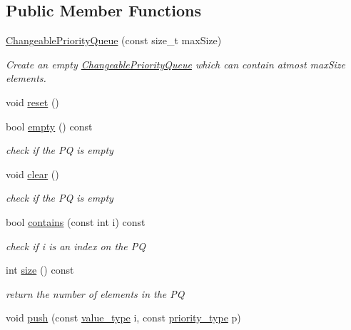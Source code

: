 \subsection*{Public Member Functions}
\begin{DoxyCompactItemize}
\item 
\hyperlink{classnifty_1_1tools_1_1ChangeablePriorityQueue_a5882abdd882fadd12ba20fd181b80c00}{Changeable\+Priority\+Queue} (const size\+\_\+t max\+Size)
\begin{DoxyCompactList}\small\item\em Create an empty \hyperlink{classnifty_1_1tools_1_1ChangeablePriorityQueue}{Changeable\+Priority\+Queue} which can contain atmost max\+Size elements. \end{DoxyCompactList}\item 
void \hyperlink{classnifty_1_1tools_1_1ChangeablePriorityQueue_a544ad33d36c8c3884951b048c9fae0d7}{reset} ()
\item 
bool \hyperlink{classnifty_1_1tools_1_1ChangeablePriorityQueue_acdf305d34b52f49fc7da051e244176db}{empty} () const 
\begin{DoxyCompactList}\small\item\em check if the P\+Q is empty \end{DoxyCompactList}\item 
void \hyperlink{classnifty_1_1tools_1_1ChangeablePriorityQueue_ab919dd067f7435c0e10268d81f474179}{clear} ()
\begin{DoxyCompactList}\small\item\em check if the P\+Q is empty \end{DoxyCompactList}\item 
bool \hyperlink{classnifty_1_1tools_1_1ChangeablePriorityQueue_aff0718c7915d834072155b5ec692e01f}{contains} (const int i) const 
\begin{DoxyCompactList}\small\item\em check if i is an index on the P\+Q \end{DoxyCompactList}\item 
int \hyperlink{classnifty_1_1tools_1_1ChangeablePriorityQueue_a2ed3d3d66aefbc62095858fc6a0dfcd1}{size} () const 
\begin{DoxyCompactList}\small\item\em return the number of elements in the P\+Q \end{DoxyCompactList}\item 
void \hyperlink{classnifty_1_1tools_1_1ChangeablePriorityQueue_ada41a7adfde46118d48833321ac94066}{push} (const \hyperlink{classnifty_1_1tools_1_1ChangeablePriorityQueue_aa00fbc748b94bdc6175b4c49bb2bba48}{value\+\_\+type} i, const \hyperlink{classnifty_1_1tools_1_1ChangeablePriorityQueue_a6ecafb387f99a1cfa7ff5795c924682c}{priority\+\_\+type} p)

\end{DoxyCompactItemize}
